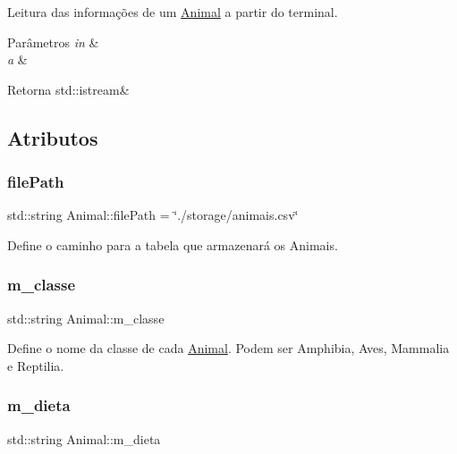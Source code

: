 Leitura das informações de um \hyperlink{classAnimal}{Animal} a partir do terminal. 


\begin{DoxyParams}{Parâmetros}
{\em in} & \\
\hline
{\em a} & \\
\hline
\end{DoxyParams}
\begin{DoxyReturn}{Retorna}
std\+::istream\& 
\end{DoxyReturn}


\subsection{Atributos}
\mbox{\label{classAnimal_a1e487e8b5e047f764f192a423e4d21ae}} 
\subsubsection{\texorpdfstring{file\+Path}{filePath}}
{\footnotesize\ttfamily std\+::string Animal\+::file\+Path = \char`\"{}./storage/animais.\+csv\char`\"{}\hspace{0.3cm}{\ttfamily [static]}}

Define o caminho para a tabela que armazenará os Animais. \mbox{\label{classAnimal_a8a4d049b481ab0fe88015cde7557d281}} 
\subsubsection{\texorpdfstring{m\+\_\+classe}{m\_classe}}
{\footnotesize\ttfamily std\+::string Animal\+::m\+\_\+classe\hspace{0.3cm}{\ttfamily [protected]}}

Define o nome da classe de cada \hyperlink{classAnimal}{Animal}. Podem ser Amphibia, Aves, Mammalia e Reptilia. \mbox{\label{classAnimal_af7ea074464d9a468f7412a2165afd553}} 
\subsubsection{\texorpdfstring{m\+\_\+dieta}{m\_dieta}}
{\footnotesize\ttfamily std\+::string Animal\+::m\+\_\+dieta\hspace{0.3cm}{\ttfamily [protected]}}

